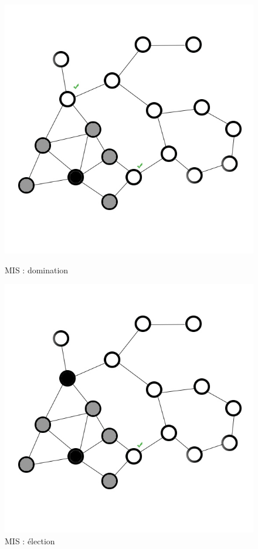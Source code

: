 \begin{figure}
   	\begin{minipage}[c]{.46\linewidth}
      	\includegraphics{images/mis3.jpg}
      	\caption{MIS : domination}
      	\label{mis3}
   	\end{minipage} \hfill
   	\begin{minipage}[c]{.46\linewidth}
      	\includegraphics{images/mis4.jpg}
		\caption{MIS : élection}
		\label{mis4}
   	\end{minipage}
\end{figure}

